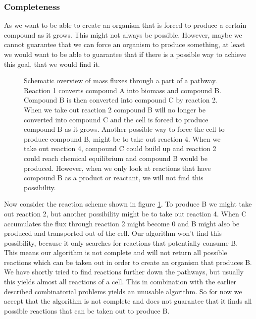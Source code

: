 \documentclass[12pt]{report}
\begin{document}
\subsubsection{Completeness}
As we want to be able to create an organism that is forced to produce a certain compound as it grows. This might not always be possible. However, maybe we cannot guarantee that we can force an organism to produce something, at least we would want to be able to guarantee that if there is a possible way to achieve this goal, that we would find it.

\begin{figure}[hbtp]
  \centering
     
      \caption{Schematic overview of mass fluxes through a part of a pathway. Reaction 1 converts compound A into biomass and compound B. Compound B is then converted into compound C by reaction 2. When we take out reaction 2 compound B will no longer be converted into compound C and the cell is forced to produce compound B as it grows. Another possible way to force the cell to produce compound B, might be to take out reaction 4. When we take out reaction 4, compound C could build up and reaction 2 could reach chemical equilibrium and compound B would be produced. However, when we only look at reactions that have compound B as a product or reactant, we will not find this possibility.}
  \label{fig:reaction-overview3}
\end{figure}
Now consider the reaction scheme shown in figure \ref{fig:reaction-overview3}.
To produce B we might take out reaction 2, but another possibility might be to take out reaction 4.
When C accumulates the flux through reaction 2 might become 0 and B might also be produced and transported out of the cell.
Our algorithm won't find this possibility, because it only searches for reactions that potentially consume B.
This means our algorithm is not complete and will not return all possible reactions which can be taken out in order to create an organism that produces B.
We have shortly tried to find reactions further down the pathways, but usually this yields almost all reactions of a cell.
This in combination with the earlier described combinatorial problems yields an unusable algorithm.
So for now we accept that the algorithm is not complete and does not guarantee that it finds all possible reactions that can be taken out to produce B.
\end{document}

